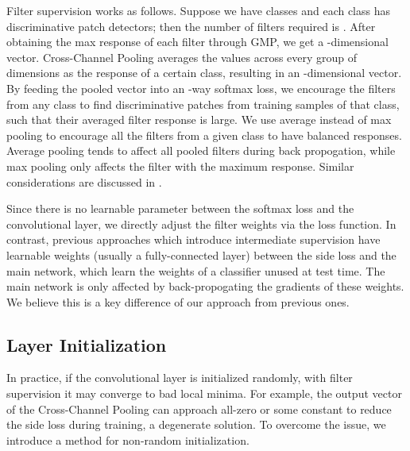 \documentclass[10pt,twocolumn,letterpaper]{article}
\begin{document}
Filter supervision works as follows. Suppose we have  classes and each class has  discriminative patch
detectors; then the number of  filters required is . After obtaining the max response of each filter through
GMP, we get a -dimensional vector. Cross-Channel Pooling averages the values across every group of 
dimensions as the response of a certain class, resulting in an -dimensional vector. By feeding the pooled vector into
an -way softmax loss, we encourage
the filters from any class to find discriminative patches from training samples of that class, such that their
averaged filter response is large. We use average instead of max
pooling to encourage all the filters from a given class to have balanced responses. Average pooling tends
to affect all pooled filters during back propogation, while max pooling only affects the filter with the maximum response.
Similar considerations are discussed in \cite{bolei}.

Since there is no learnable parameter between the softmax loss and the 
convolutional layer, we directly adjust the
filter weights via the loss function. 
In contrast, previous approaches which introduce intermediate supervision \cite{dsn, lcnn, cite_lcnn} have learnable
weights (usually a fully-connected layer)
between the side loss and the main network, which learn the weights of a classifier unused at test time. The
main network is only affected by back-propogating the gradients of these weights. We believe this is a key difference
of our approach from previous ones.

\subsection{Layer Initialization} \label{sec3_4}
In practice, if
the  convolutional layer is initialized randomly, with filter supervision it may converge to bad local minima. For
example, the output vector of the Cross-Channel Pooling can 
approach all-zero or some constant to reduce the side loss during training, a degenerate solution. To overcome the
issue, we introduce a method for non-random initialization.
\end{document}
